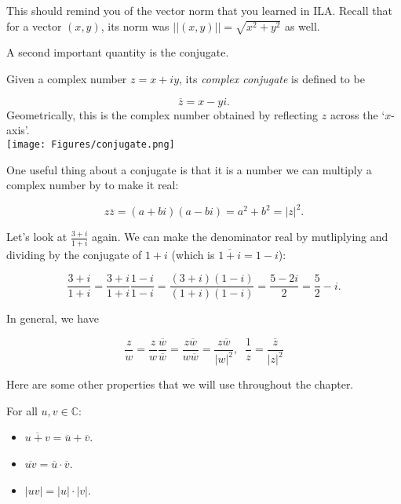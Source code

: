 \documentclass[11pt,dvipsnames]{book}
\numberwithin{equation}{section} %
\numberwithin{figure}{section} %
\numberwithin{table}{section} %
\begin{document}
This should remind you of the vector norm that you learned in ILA. Recall that for a vector $(x,y)$, its norm was $||(x,y)|| = \sqrt{x^2+y^2}$ as well. 

A second important quantity is the conjugate. 

\begin{definition} 
\begin{multicols}{2}
Given a complex number $z=x+iy$, its {\em complex conjugate} is defined to be 

\[\overline{z}=x-yi.
\]
Geometrically, this is the complex number obtained by reflecting $z$  across the `$x$-axis'. \\

\texttt{[image: Figures/conjugate.png]}

\end{multicols}

\end{definition}



One useful thing about a conjugate is that it is a number we can multiply a complex number by to make it real:

$$z\overline{z} = (a+bi)(a-bi) = a^2 + b^2 = |z|^2.$$



Let's look at $\frac{3+i}{1+i}$ again. We can make the denominator real by mutliplying and dividing by the conjugate of $1+i$ (which is $\overline{1+i}=1-i$):

$$\frac{3+i}{1+i}=\frac{3+i}{1+i}\frac{1-i}{1-i} = \frac{(3+i)(1-i)}{(1+i)(1-i)} = \frac{5-2i}{2}=\frac{5}{2}-i.
$$

In general, we have

\begin{equation}
\label{e:1/z}
 \frac{z}{w} = \frac{z}{w}\frac{\overline w}{\overline w} = \frac{z\overline w}{w\overline w} = \frac{z\overline w}{|w|^2}, \;\; \frac{1}{z} = \frac{\overline{z}}{|z|^2}
 \end{equation}


Here are some other properties that we will use throughout the chapter.

\begin{lemma}
For all $u,v\in \mathbb{C}$:
\begin{itemize}
\item $\overline{u+v} = \overline{u}+\overline{v}$.
\item $\overline{uv} = \overline{u}\cdot\overline{v}$.
\item $|uv|=|u|\cdot|v|$.
\end{itemize}
\end{lemma}
\end{document}
